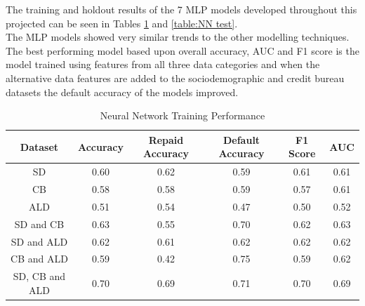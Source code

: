 The training and holdout results of the 7 MLP models developed throughout this projected can be seen in Tables \ref{table:NN training} and \ref{table:NN test}.  \\

The MLP models showed very similar trends to the other modelling techniques. The best performing model based upon overall accuracy, AUC and F1 score is the model trained using features from all three data categories and when the alternative data features are added to the sociodemographic and credit bureau datasets the default accuracy of the models improved.    

\vspace{10pt}

\begin{table}[H]
\begin{center}
\begin{tabular}{|c|c|c|c|c|c|} 
\hline
\multicolumn{1}{|c|}{Dataset}
&\multicolumn{1}{|c|}{Accuracy}
&\multicolumn{1}{|c|}{Repaid Accuracy}
&\multicolumn{1}{|c|}{Default Accuracy}
&\multicolumn{1}{|c|}{F1 Score}
&\multicolumn{1}{|c|}{AUC}\\
\hline
SD & 0.60 & 0.62 & 0.59 & 0.61 & 0.61    \\
\hline
CB & 0.58 & 0.58 & 0.59 & 0.57 & 0.61    \\
\hline
ALD & 0.51 & 0.54 & 0.47 & 0.50 & 0.52    \\
\hline
SD and CB & 0.63 & 0.55 & 0.70 & 0.62 & 0.63    \\
\hline
SD and ALD & 0.62 & 0.61 & 0.62 & 0.62 & 0.62    \\
\hline
CB and ALD & 0.59 & 0.42 & 0.75 & 0.59 & 0.62    \\
\hline
SD, CB and ALD & 0.70 & 0.69 & 0.71 & 0.70 & 0.69    \\
\hline
\end{tabular}
\end{center}
\caption{Neural Network Training Performance}
\label{table:NN training}
\end{table}

\vspace{10pt}

